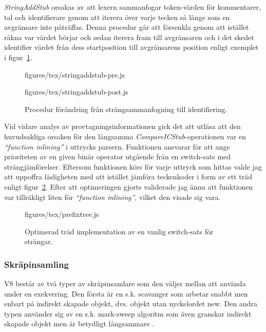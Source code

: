 \textit{StringAddStub} orsakas av att lexern sammanfogar token-värden för
kommentarer, tal och identifierare genom att iterera över varje tecken så
länge som en avgränsare inte påträffas. Denna procedur går att försenkla genom
att istället räkna var värdet börjar och sedan iterera fram till avgränsaren
och i det skedet identifier värdet från dess startposition till avgränsarens
position enligt exemplet i figur~\ref{fig:stringAddStub}.

\begin{figure}[ht]
  \begin{minipage}[t]{0.5\textwidth}
      {figures/tex/stringaddstub-pre.js}
  \end{minipage}%
  \begin{minipage}[t]{0.5\textwidth}
      {figures/tex/stringaddstub-post.js}
  \end{minipage}
  \caption{Procedur förändring från strängsammanfogning till identifiering.}
  \label{fig:stringAddStub}
\end{figure}

Vid vidare analys av provtagningsinformationen gick det att utläsa att den
huvudsakliga orsaken för den långsamma \textit{CompareICStub}-operationen var
en \textit{``function inlining''} i uttrycks parsern. Funktionen ansvarar för
att ange prioriteten av en given binär operator utgående från en switch-sats
med strängjämförelser. Eftersom funktionen körs för varje uttryck som hittas
valde jag att uppoffra läsligheten med att istället jämföra teckenkoder i
form av ett träd enligt figur~\ref{fig:switchtree}. Efter att optimeringen
gjorts validerade jag ännu att funktionen var tillräkligt liten för
\textit{``function inlining''}, vilket den visade sig vara.

\begin{figure}[ht]
    {figures/tex/prefixtree.js}
  \caption{Optimerad träd implementation av en vanlig switch-sats för
    strängar.} \label{fig:switchtree}
\end{figure}

\subsubsection{Skräpinsamling}

V8 består av två typer av skräpinsamlare som den väljer mellan att använda
under en exekvering. Den första är en s.k. scavanger som arbetar snabbt men enbart
på indirekt skapade objekt, dvs. objekt utan nyckelordet new. Den andra typen
använder sig av en s.k. mark-sweep algoritm som även granskar indirekt skapade
objekt men är betydligt långsammare \citep{ma10}.

